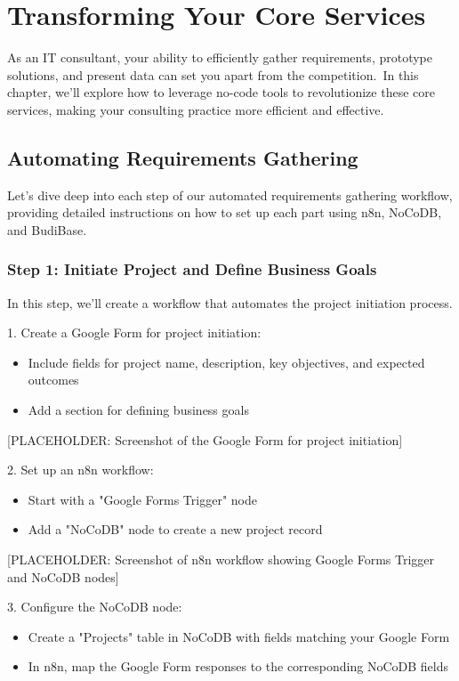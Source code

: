 \chapter{Transforming Your Core Services}\label{ch:transforming-your-core-services}



As an IT consultant, your ability to efficiently gather requirements, prototype solutions, and present data can set you apart from the competition.\ In this chapter, we'll explore how to leverage no-code tools to revolutionize these core services, making your consulting practice more efficient and effective.


\section{Automating Requirements Gathering}

Let's dive deep into each step of our automated requirements gathering workflow, providing detailed instructions on how to set up each part using n8n, NoCoDB, and BudiBase.

\subsection{Step 1: Initiate Project and Define Business Goals}

In this step, we'll create a workflow that automates the project initiation process.

1. Create a Google Form for project initiation:
\begin{itemize}
    \item Include fields for project name, description, key objectives, and expected outcomes
    \item Add a section for defining business goals
\end{itemize}

[PLACEHOLDER: Screenshot of the Google Form for project initiation]

2. Set up an n8n workflow:
\begin{itemize}
    \item Start with a "Google Forms Trigger" node
    \item Add a "NoCoDB" node to create a new project record
\end{itemize}

[PLACEHOLDER: Screenshot of n8n workflow showing Google Forms Trigger and NoCoDB nodes]

3. Configure the NoCoDB node:
\begin{itemize}
    \item Create a "Projects" table in NoCoDB with fields matching your Google Form
    \item In n8n, map the Google Form responses to the corresponding NoCoDB fields
\end{itemize}

